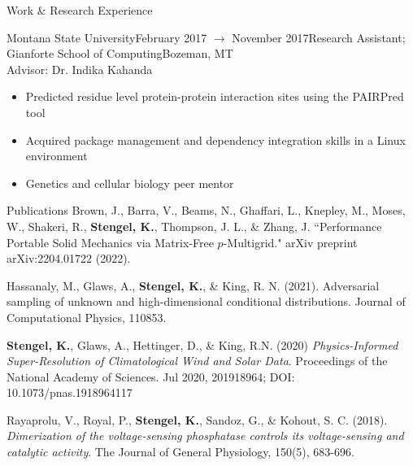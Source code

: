 \documentclass{resume} %
\begin{document}
\begin{rSection}{Work \& Research Experience}
\begin{rSubsection}{Montana State University}{February 2017 $\to$ November 2017}{Research Assistant; Gianforte School of Computing}{Bozeman, MT}\\
Advisor: Dr. Indika Kahanda
\begin{itemize}
        \setlength \itemsep{-0.4em}
        \item Predicted residue level protein-protein interaction sites using the PAIRPred tool
        \item Acquired package management and dependency integration skills in a Linux environment
        \item Genetics and cellular biology peer mentor
        \end{itemize}
\end{rSubsection}

\end{rSection}
\iftrue
\begin{rSection}{Publications}
Brown, J., Barra, V., Beams, N., Ghaffari, L., Knepley, M., Moses, W., Shakeri, R.,  \textbf{Stengel, K.}, Thompson, J. L., \& Zhang, J. ``Performance Portable Solid Mechanics via Matrix-Free $p$-Multigrid." arXiv preprint arXiv:2204.01722 (2022).

Hassanaly, M., Glaws, A., \textbf{Stengel, K.}, \& King, R. N. (2021). Adversarial sampling of unknown and high-dimensional conditional distributions. Journal of Computational Physics, 110853.

\textbf{Stengel, K.}, Glaws, A., Hettinger, D., \& King, R.N. (2020) \textit{Physics-Informed Super-Resolution of Climatological Wind and Solar Data}. Proceedings of the National Academy of Sciences. Jul 2020, 201918964; DOI: 10.1073/pnas.1918964117

Rayaprolu, V., Royal, P., \textbf{Stengel, K.}, Sandoz, G., \& Kohout, S. C. (2018). \textit{Dimerization of the voltage-sensing phosphatase controls its voltage-sensing and catalytic activity}. The Journal of General Physiology, 150(5), 683-696.
\end{rSection}
\fi
\end{document}
